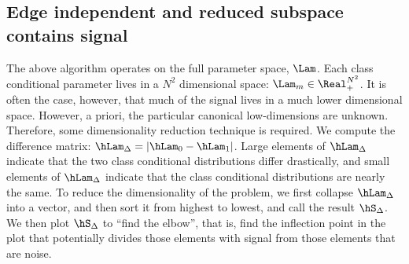 % 
% 



\subsection{Edge independent and reduced subspace contains signal} %
\label{sub:edge_independent_and_reduced_subspace_contains_signal}

The above algorithm operates on the full parameter space, $\Lam$.  Each class conditional parameter lives in a $N^2$ dimensional space: $\Lam_m \in \Real_+^{N^2}$.  It is often the case, however, that much of the signal lives in a much lower dimensional space.  However, a priori, the particular canonical low-dimensions are unknown.  Therefore, some dimensionality reduction technique is required.  We compute the difference matrix: $\hLam_{\Delta}=|\hLam_0 - \hLam_1|$.  Large elements of $\hLam_{\Delta}$ indicate that the two class conditional distributions differ drastically, and small elements of $\hLam_{\Delta}$ indicate that the class conditional distributions are nearly the same.  To reduce the dimensionality of the problem, we first collapse $\hLam_{\Delta}$ into a vector, and then sort it from highest to lowest, and call the result $\hS_{\Delta}$.   We then plot $\hS_{\Delta}$ to ``find the elbow'', that is, find the inflection point in the plot that potentially divides those elements with signal from those elements that are noise.  


